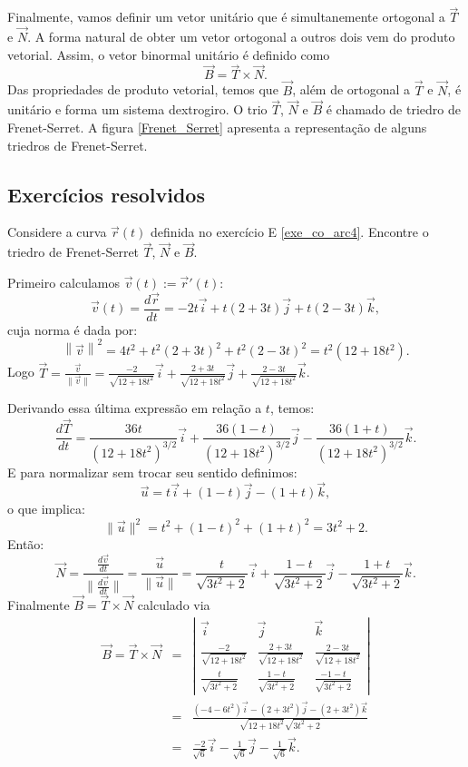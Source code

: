 Finalmente, vamos definir um vetor unitário que é simultanemente ortogonal a $\vec{T}$ e $\vec{N}$. A forma natural de obter um vetor ortogonal a outros dois vem do produto vetorial. Assim, o vetor binormal unitário é definido como
$$
\vec{B}=\vec{T}\times\vec{N}.
$$
Das propriedades de produto vetorial, temos que $\vec{B}$, além de ortogonal a $\vec{T}$ e $\vec{N}$, é unitário e forma um sistema dextrogiro. O trio $\vec{T}$, $\vec{N}$ e $\vec{B}$ é chamado de triedro de Frenet-Serret. A figura \ref{Frenet_Serret} apresenta a representação de alguns triedros de Frenet-Serret.


\subsection*{Exercícios resolvidos} %

\begin{exeresol}
  Considere a curva $\vec{r}(t)$ definida no exercício E \ref{exe_co_arc4}. Encontre o triedro de Frenet-Serret $\vec{T}$, $\vec{N}$ e $\vec{B}$.
\end{exeresol}
\begin{resol}
  Primeiro calculamos $\vec{v}(t):=\vec{r}\!'(t)$:
 $$\vec{v}(t) = \frac{d \vec{r}}{dt} = -2t \vec{i} + t(2+3t) \vec{j} + t(2-3t)\vec{k},$$
 cuja norma é dada por:
  $$\left\|\vec{v} \right\|^2 = 4t^2 + t^2(2+3t)^2 + t^2(2-3t)^2 = t^2(12+18t^2).$$ 
  Logo $\vec{T} = \frac{\vec{v}}{\|\vec{v}\|} = \frac{-2 }{\sqrt{12+18t^2}}\vec{i} + \frac{2+3t}{\sqrt{12+18t^2}}\vec{j} + \frac{2-3t}{\sqrt{12+18t^2}}\vec{k}$. 
  
  Derivando essa última expressão em relação a $t$, temos:
  $$\frac{d\vec{T}}{dt} = \frac{36t}{(12+18t^2)^{3/2}} \vec{i} + \frac{36(1-t)}{(12+18t^2)^{3/2}} \vec{j} - \frac{36(1+t)}{(12+18t^2)^{3/2}} \vec{k}.$$
    E para normalizar sem trocar seu sentido definimos: 
    $$\vec{u} = t \vec{i} + (1-t) \vec{j} - (1+t)\vec{k},$$ 
    o que implica: $$\|\vec{u}\|^2=t^2 + (1-t)^2 + (1+t)^2 = 3t^2 + 2.$$
    Então:
     $$\vec{N} = \frac{\frac{d\vec{v}}{dt}}{\|\frac{d\vec{v}}{dt}\|} = \frac{\vec{u}}{\|\vec{u}\|}=\frac{t}{\sqrt{3t^2+2}} \vec{i} + \frac{1-t}{\sqrt{3t^2+2}} \vec{j} - \frac{1+t}{\sqrt{3t^2+2}} \vec{k}.$$ 
     Finalmente $ \vec{B} = \vec{T} \times \vec{N}$ calculado via \begin{eqnarray*}
      \vec{B} = \vec{T} \times \vec{N} &=&
      \left| \begin{array}{ccc}
\vec{i} & \vec{j} & \vec{k} \\
\frac{-2}{\sqrt{12+18t^2}} & \frac{2+3t}{\sqrt{12+18t^2}} & \frac{2-3t}{\sqrt{12+18t^2}} \\
\frac{t}{\sqrt{3t^2+2}} & \frac{1-t}{\sqrt{3t^2+2}} &  \frac{-1-t}{\sqrt{3t^2+2}} \end{array} \right|\\ &=& \frac{(-4-6t^2)\vec{i} - (2+3t^2)\vec{j} - (2+3t^2)\vec{k}}{ \sqrt{12+18t^2} \sqrt{3t^2+2}}\\
&=& \frac{-2}{\sqrt{6}} \vec{i} - \frac{1}{\sqrt{6}} \vec{j} - \frac{1}{\sqrt{6}} \vec{k}.
\end{eqnarray*}
\end{resol}

